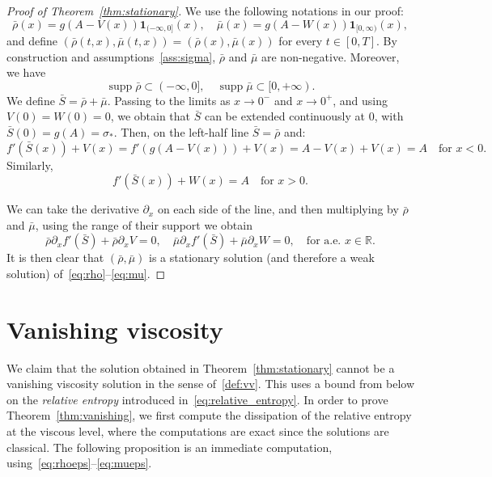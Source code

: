 \documentclass[a4paper,twosided, 11pt]{article}
\newcommand{\R}{\mathbb{R}}
\DeclareMathOperator*{\supp}{\operatorname{supp}}
\theoremstyle{plain}
\theoremstyle{remark}
\newcommand{\one}{\mathbf{1}}
\numberwithin{equation}{section}
\begin{document}
\begin{proof}[Proof of Theorem~\ref{thm:stationary}]
We use the following notations in our proof: 
$$
\bar\rho(x)=g\left(A-V(x)\right)\one_{(-\infty,0]}(x),
\quad \bar\mu(x)=g\left(A-W(x)\right)\one_{[0,\infty)}(x),
$$
and define $(\bar\rho(t,x),\bar\mu(t,x))=(\bar\rho(x),\bar\mu(x))$ for every $t\in[0,T]$. 
By construction and assumptions~\ref{ass:sigma}, $\bar\rho$ and $\bar\mu$ are non-negative. 
Moreover, we have
$$
\supp \bar{\rho}\subset (-\infty,0], \quad \supp \bar{\mu}\subset[0,+\infty).
$$
We define $\bar{S} = \bar{\rho} + \bar{\mu}$. Passing to the limits as $x\to0^-$ and $x\to0^+$, and using $V(0)=W(0)=0$, we obtain that $\bar{S}$ can be extended continuously at 0, with $\bar{S}(0)=g(A)=\sigma_*$. Then, on the left-half line $\bar{S}=\bar{\rho}$ and:
$$
f'(\bar S(x))+V(x)=f'(g(A-V(x)))+V(x)=A-V(x)+V(x)=A
\quad\text{for }x<0.
$$
Similarly,
$$
f'(\bar S(x)) + W(x) = A \quad \text{for }x>0.
$$

We can take the derivative $\partial_x$ on each side of the line, and then multiplying by $\bar{\rho}$ and $\bar{\mu}$, using the range of their support we obtain 
$$
\bar\rho \partial_x f'(\bar S)+\bar\rho \partial_x V=0,
\quad \bar\mu \partial_x f'(\bar S)+\bar\mu \partial_x W=0,\quad  \text{for a.e. }x\in\R.
$$
It is then clear that $(\bar{\rho}, \bar{\mu})$ is a stationary solution (and therefore a weak solution) of~\eqref{eq:rho}--\eqref{eq:mu}.
\end{proof}

\section{Vanishing viscosity}

We claim that the solution obtained in Theorem~\ref{thm:stationary} cannot be a vanishing viscosity solution in the sense of~\ref{def:vv}. This uses a bound from below on the \textit{relative entropy} introduced in~\eqref{eq:relative_entropy}. In order to prove Theorem~\ref{thm:vanishing}, we first compute the dissipation of the relative entropy at the viscous level, where the computations are exact since the solutions are classical. The following proposition is an immediate computation, using~\eqref{eq:rhoeps}--\eqref{eq:mueps}.
\end{document}
